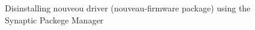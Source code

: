 \documentclass[a4paper,13pt]{article}
\begin{document}
\begin{figure}[H]
\caption{Disinstalling nouveou driver (nouveau-firmware package) using the Synaptic Packege Manager }
\end{figure}
\end{document}
